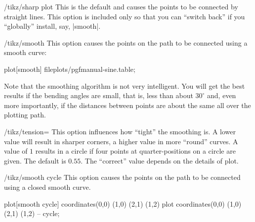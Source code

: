\begin{key}{/tikz/sharp plot}
  This is the default and causes the points to be connected by
  straight lines. This option is included only so that you can
  ``switch back'' if you ``globally'' install, say, |smooth|.
\end{key}

\begin{key}{/tikz/smooth}
  This option causes the points on the path to be connected using a
  smooth curve:

\begin{codeexample}[]
\tikz\draw plot[smooth] file{plots/pgfmanual-sine.table};
\end{codeexample}

  Note that the smoothing algorithm is not very intelligent. You will
  get the best results if the bending angles are small, that is, less
  than about $30^\circ$ and, even more importantly, if the distances
  between points are about the same all over the plotting path.
\end{key}

\begin{key}{/tikz/tension=}
  This option influences how ``tight'' the smoothing is. A lower value
  will result in sharper corners, a higher value in more ``round''
  curves. A value of $1$ results in a circle if four points at
  quarter-positions on a circle are given. The default is $0.55$. The
  ``correct'' value depends on the details of plot.
  
\begin{codeexample}[]
\end{codeexample}
\end{key}

\begin{key}{/tikz/smooth cycle}
  This option causes the points on the path to be connected using a
  closed smooth curve. 

\begin{codeexample}[]
\tikz[scale=0.5]
  \draw plot[smooth cycle] coordinates{(0,0) (1,0) (2,1) (1,2)}
        plot               coordinates{(0,0) (1,0) (2,1) (1,2)} -- cycle;
\end{codeexample}
\end{key}

